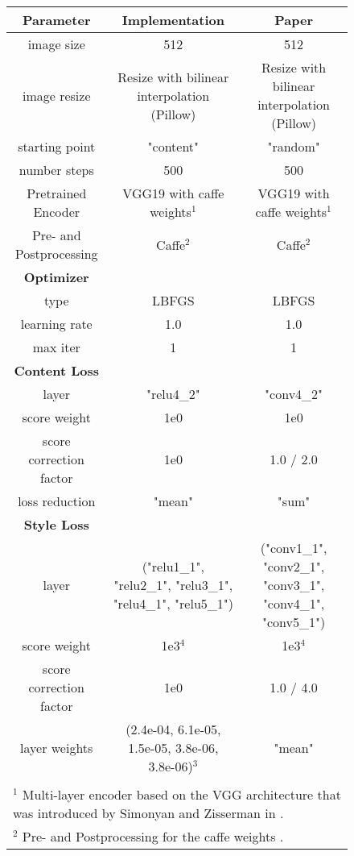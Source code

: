 \begin{figure}[H]
\vspace{19cm}
\begin{center}
	\begin{rotate}{90}
		\footnotesize
	\centering
	\begin{tabular}{c|c|c}
		\hline
		\bfseries Parameter & \bfseries Implementation & \bfseries Paper\\
		\hline\hline
		image size & 512 & 512 \\
		image resize & Resize with bilinear interpolation (Pillow) & Resize with bilinear interpolation (Pillow)\\
		starting point & "content" & "random" \\
		number steps & 500 & 500 \\
		Pretrained Encoder & VGG19 with caffe weights$^1$ & VGG19 with caffe weights$^1$ \\
		Pre- and Postprocessing & Caffe$^2$ & Caffe$^2$\\
		\hline
		\bfseries Optimizer & &\\
		\hline
		type & LBFGS & LBFGS\\
		learning rate & 1.0 & 1.0\\
		max iter & 1 & 1 \\
		\hline
		\bfseries  Content Loss & & \\
		\hline
		layer & "relu4\_2" & "conv4\_2" \\
		score weight & 1e0 & 1e0 \\
 		score correction factor & 1e0 & 1.0 / 2.0 \\
		loss reduction & "mean" & "sum" \\
		\hline
		\bfseries  Style Loss & & \\
		\hline
		layer & ("relu1\_1", "relu2\_1", "relu3\_1", "relu4\_1", "relu5\_1") & ("conv1\_1", "conv2\_1", "conv3\_1", "conv4\_1", "conv5\_1") \\
		score weight & 1e3$^4$ & 1e3$^4$ \\
		score correction factor & 1e0 & 1.0 / 4.0 \\
		layer weights & (2.4e-04, 6.1e-05, 1.5e-05, 3.8e-06, 3.8e-06)$^3$ & "mean" \\
		\hline
		\multicolumn{3}{l}{ }\\
		\multicolumn{3}{l}{\scriptsize{$^1$ Multi-layer encoder based on the VGG architecture that was introduced by Simonyan and Zisserman in \cite{SZ2015}.}}\\
		\multicolumn{3}{l}{\scriptsize{$^2$ Pre- and Postprocessing for the caffe weights \cite{SZ2015}.}}\\

\end{tabular}
\end{rotate}
\end{center}
\end{figure}
